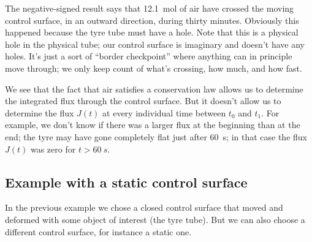 \documentclass[a4paper,12pt,%
onecolumn,oneside,titlepage,%
british%
]{memoir}
\renewcommand*{\|}[1][]{\nonscript\:#1\vert\nonscript\:\mathopen{}}
\newcommand*{\yti}{t_{0}}
\newcommand*{\ytf}{t_{1}}
\newcommand*{\yJ}{J}
\begin{document}
%
The negative-signed result says that \qty{12.1}{mol} of air have crossed the moving control surface, in an outward direction, during thirty minutes. Obviously this happened because the tyre tube must have a hole.
Note that this is a physical hole in the physical tube; our control surface is imaginary and doesn't have any holes. It's just a sort of \enquote{border checkpoint} where anything can in principle move through; we only keep count of what's crossing, how much, and how fast.

We see that the fact that air satisfies a conservation law allows us to determine the integrated flux through the control surface. But it doesn't allow us to determine the flux $\yJ(t)$ at every individual time between $\yti$ and $\ytf$. For example, we don't know if there was a larger flux at the beginning than at the end; the tyre may have gone completely flat just after \qty{60}{s}; in that case the flux $\yJ(t)$ was zero for $t>\qty{60}{s}$.

\subsection{Example with a static control surface}
\label{sec:example_conservation_static}

In the previous example we chose a closed control surface that moved and deformed with some object of interest (the tyre tube). But we can also choose a different control surface, for instance a static one.
\end{document}
